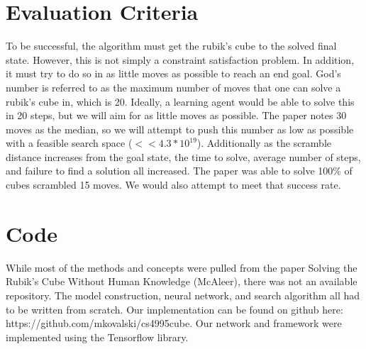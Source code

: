 \documentclass[10pt,twocolumn,letterpaper]{article}
\begin{document}

\section{Evaluation Criteria}

To be successful, the algorithm must get the rubik’s cube to the solved final state. However, this is not simply a constraint satisfaction problem. In addition, it must try to do so in as little moves as possible to reach an end goal. God’s number is referred to as the maximum number of moves that one can solve a rubik’s cube in, which is 20. Ideally, a learning agent would be able to solve this in 20 steps, but we will aim for as little moves as possible. The paper notes 30 moves as the median, so we will attempt to push this number as low as possible with a feasible search space ($<< 4.3 * 10^{19}$).  Additionally as the scramble distance increases from the goal state, the time to solve, average number of steps, and failure to find a solution all increased.  The paper was able to solve 100\% of cubes scrambled 15 moves.  We would also attempt to meet that success rate. 




\section{Code}

While most of the methods and concepts were pulled from the paper Solving the Rubik’s Cube Without Human Knowledge (McAleer), there was not an available repository.  The model construction, neural network, and search algorithm all had to be written from scratch.  Our implementation can be found on github here: https://github.com/mkovalski/cs4995\textunderscore cube.  Our network and framework were implemented using the Tensorflow library. 


\end{document}
